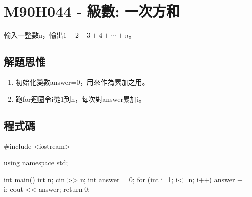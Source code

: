 \section{M90H044 - 級數: 一次方和}
輸入一整數n，輸出$1+2+3+4+\cdots+n$。
\subsection{解題思惟}
\begin{enumerate}
	\item 初始化變數answer=0，用來作為累加之用。
	\item 跑for迴圈令i從1到n，每次對answer累加i。
\end{enumerate}
\subsection{程式碼}
\begin{cppcode}
#include <iostream>

using namespace std;

int main()
{
	int n;
	cin >> n;
	int answer = 0;
	for (int i=1; i<=n; i++) answer += i;
	cout << answer;
	return 0;
}
\end{cppcode}
